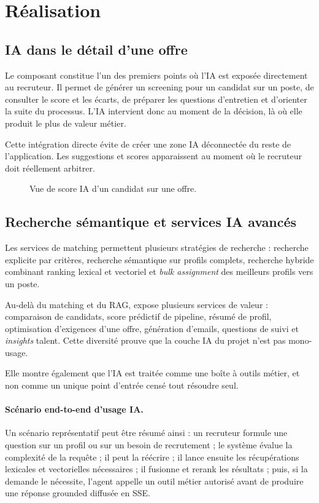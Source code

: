 \section{Réalisation}

\subsection{IA dans le détail d'une offre}
Le composant  constitue l'un des premiers points où l'IA est exposée directement au recruteur. Il permet de générer un screening pour un candidat sur un poste, de consulter le score et les écarts, de préparer les questions d'entretien et d'orienter la suite du processus. L'IA intervient donc au moment de la décision, là où elle produit le plus de valeur métier.

Cette intégration directe évite de créer une zone IA déconnectée du reste de l'application. Les suggestions et scores apparaissent au moment où le recruteur doit réellement arbitrer.

\begin{figure}[H]
  \centering
  \caption{Vue de score IA d'un candidat sur une offre.}
\end{figure}

\subsection{Recherche sémantique et services IA avancés}
Les services de matching permettent plusieurs stratégies de recherche : recherche explicite par critères, recherche sémantique sur profils complets, recherche hybride combinant ranking lexical et vectoriel et \textit{bulk assignment} des meilleurs profils vers un poste.

Au-delà du matching et du RAG,  expose plusieurs services de valeur : comparaison de candidats, score prédictif de pipeline, résumé de profil, optimisation d'exigences d'une offre, génération d'emails, questions de suivi et \textit{insights} talent. Cette diversité prouve que la couche IA du projet n'est pas mono-usage.

Elle montre également que l'IA est traitée comme une boîte à outils métier, et non comme un unique point d'entrée censé tout résoudre seul.
\paragraph{Scénario end-to-end d'usage IA.}
Un scénario représentatif peut être résumé ainsi : un recruteur formule une question sur un profil ou sur un besoin de recrutement ; le système évalue la complexité de la requête ; il peut la réécrire ; il lance ensuite les récupérations lexicales et vectorielles nécessaires ; il fusionne et rerank les résultats ; puis, si la demande le nécessite, l'agent appelle un outil métier autorisé avant de produire une réponse grounded diffusée en SSE.

